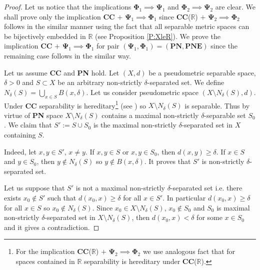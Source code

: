 \documentclass[11pt, reqno]{amsart}
\theoremstyle{definition}
\numberwithin{theorem}{section}
\theoremstyle{definition}
\theoremstyle{definition}
\theoremstyle{definition}
\theoremstyle{definition}
\newcommand{\brac}[1]{\left({#1}\right)}
\theoremstyle{definition}
\numberwithin{claim}{section}
\theoremstyle{definition}
\theoremstyle{definition}
\theoremstyle{definition}
\theoremstyle{definition}
\theoremstyle{definition}
\theoremstyle{remboldstyle}
\begin{document}
\begin{proof}
Let us notice that the implications $\mathbf{\Phi}_1 \implies \mathbf{\Psi}_1$ and $\mathbf{\Phi}_2 \implies \mathbf{\Psi}_2$ are clear. 
We shall prove only the implication \textbf{CC} $+$ $\mathbf{\Psi}_1 \implies \mathbf{\Phi}_1$ 
since \textbf{CC}($\mathbb{R}$) $+$ $\mathbf{\Psi}_2 \implies \mathbf{\Phi}_2$ follows in the similar manner using the fact that all separable metric spaces can be bijectively embedded in $\mathbb{R}$ (see Proposition \ref{P:XleR}). We prove the implication \textbf{CC} $+$ $\mathbf{\Psi}_1 \implies \mathbf{\Phi}_1$  for pair $(\mathbf{\Psi}_1, \mathbf{\Phi}_1) = (\textbf{PN}, \textbf{PNE})$ since the remaining case follows in the similar way.

    Let us assume \textbf{CC} and \textbf{PN} hold. Let $(X, d)$ be a pseudometric separable space, $\delta > 0$ and $S \subset X$ be an arbitrary non-strictly $\delta$-separated set. We define $N_\delta(S) = \bigcup_{x 
    \in S} B\brac{x, \delta}$. Let us consider pseudometric space $\brac{X \setminus N_\delta(S), d}$. Under \textbf{CC} separability is hereditary\footnote{For the implication \textbf{CC}($\mathbb{R}$) $+$ $\mathbf{\Psi}_2 \implies \mathbf{\Phi}_2$ we use analogous fact that for spaces contained in $\mathbb{R}$ separability is hereditary under \textbf{CC}($\mathbb{R}$).} (see \cite[Theorem $1.12$]{bentley}) so $X \setminus N_\delta(S)$ is separable. Thus by virtue of \textbf{PN} space $X \setminus N_\delta(S)$ contains a maximal non-strictly $\delta$-separable set $S_0$. We claim that $S' := S \cup S_0$ is the maximal non-strictly $\delta$-separated set in $X$ containing $S$.

    Indeed, let $x, y \in S'$, $x \neq y$. If $x, y \in S$ or $x, y \in S_0$, then $d(x, y) \ge \delta$. If $x \in S$ and $y \in S_0$, then $y \notin N_\delta(S)$ so $y \notin B(x, \delta)$. It proves that $S'$ is non-strictly $\delta$-separated set.

    Let us suppose that $S'$ is not a maximal non-strictly $\delta$-separated set i.e. there exists $x_0 \notin S'$ such that $d(x_0, x) \ge \delta$ for all $x \in S'$. In particular $d(x_0, x) \ge \delta$ for all $x \in S$ so $x_0 \notin N_\delta(S)$. Since $x_0 \in X \setminus N_\delta(S)$, $x_0 \notin S_0$ and $S_0$ is maximal non-strictly $\delta$-separated set in $X \setminus N_\delta(S)$, then $d(x_0, x) < \delta$ for some $x \in S_0$ and it gives a contradiction.
\end{proof}
\end{document}
